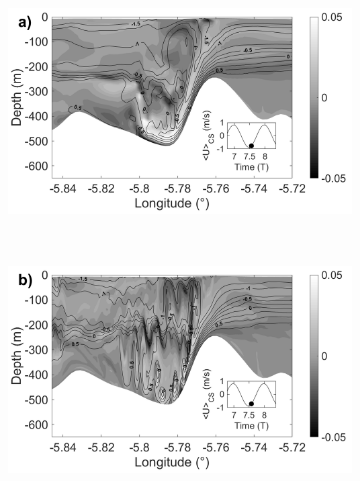 \documentclass[a4paper,12pt]{article}
\begin{document}
\begin{figure}[!h]
  
  \begin{subfigure}{0.5\linewidth}
  \includegraphics[width=\textwidth]{RV_75T_ref.png}
  \end{subfigure}
  ~
  \begin{subfigure}{0.5\linewidth}
  \includegraphics[width=\textwidth]{RV_75T_50m.png}
  \end{subfigure}
  

\end{figure}
\end{document}

